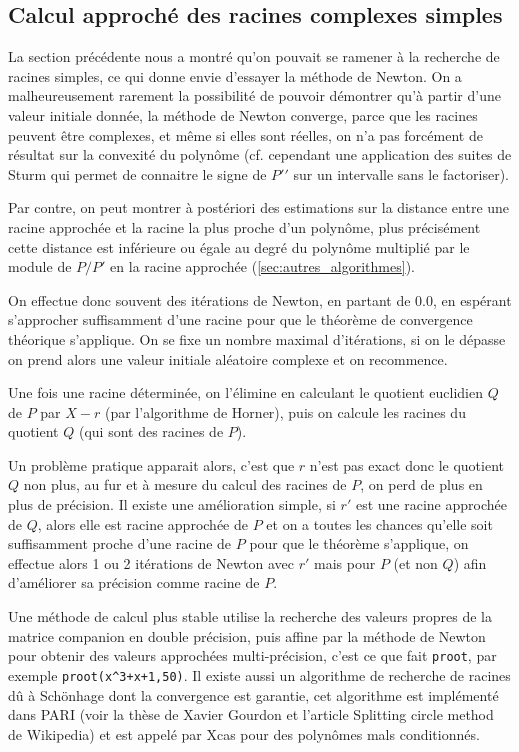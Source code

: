 \documentclass[a4paper,11pt]{article}
\begin{document}
\subsection{Calcul approch\'e des racines complexes simples} 
 
La section pr\'ec\'edente nous a montr\'e qu'on pouvait
se ramener \`a la recherche de racines simples, ce qui 
donne envie d'essayer la m\'ethode de Newton. On a malheureusement
rarement la possibilit\'e de pouvoir d\'emontrer qu'\`a partir d'une valeur
initiale donn\'ee, la m\'ethode de Newton converge, 
parce que les racines peuvent \^etre complexes, et m\^eme si elles
sont r\'eelles, on n'a pas forc\'ement de r\'esultat sur la convexit\'e
du polyn\^ome (cf. cependant une application des suites de
Sturm qui permet de connaitre le signe
de $P'{'}$ sur un intervalle sans le factoriser).

Par contre, on peut montrer \`a post\'eriori des estimations sur la
distance entre une racine approch\'ee et la racine la plus proche
d'un polyn\^ome, plus pr\'ecis\'ement cette distance est inf\'erieure
ou \'egale au degr\'e du polyn\^ome multipli\'e par le module
de $P/P'$ en la racine approch\'ee (\ref{sec:autres_algorithmes}).

On effectue donc souvent des it\'erations de Newton, en partant de
0.0, en esp\'erant s'approcher suffisamment d'une racine pour que
le th\'eor\`eme de convergence th\'eorique s'applique. On se fixe
un nombre maximal d'it\'erations, si on le d\'epasse on prend alors
une valeur initiale al\'eatoire complexe et on recommence.

Une fois une racine d\'etermin\'ee, on l'\'elimine en calculant
le quotient euclidien $Q$ de $P$ par $X-r$ (par l'algorithme de Horner),
puis on calcule les racines du quotient $Q$ (qui sont des racines de $P$).

Un probl\`eme pratique apparait alors, c'est que $r$ n'est pas exact
donc le quotient $Q$ non plus, au fur et \`a mesure du calcul des
racines de $P$, on perd de plus en plus de pr\'ecision.
Il existe une am\'elioration simple, si $r'$ est une racine
approch\'ee de $Q$, alors elle est racine approch\'ee de $P$
et on a toutes les chances qu'elle soit suffisamment proche
d'une racine de $P$ pour que le th\'eor\`eme s'applique, on
effectue alors 1 ou 2 it\'erations de Newton avec $r'$ mais pour $P$
(et non $Q$) afin d'am\'eliorer sa pr\'ecision comme racine de $P$.

Une m\'ethode de calcul plus stable utilise la recherche des valeurs
propres de la matrice companion en double pr\'ecision, 
puis affine par la m\'ethode de
Newton pour obtenir des valeurs approch\'ees multi-pr\'ecision,
c'est ce que fait \verb|proot|, par exemple \verb|proot(x^3+x+1,50)|.
Il existe aussi un algorithme de recherche de racines
d\^u \`a Sch\"onhage dont la convergence
est garantie, cet algorithme est impl\'ement\'e dans PARI (voir
la th\`ese de Xavier Gourdon et l'article Splitting circle method de Wikipedia)
et est appel\'e par Xcas pour des polyn\^omes mals conditionn\'es.
\end{document}
